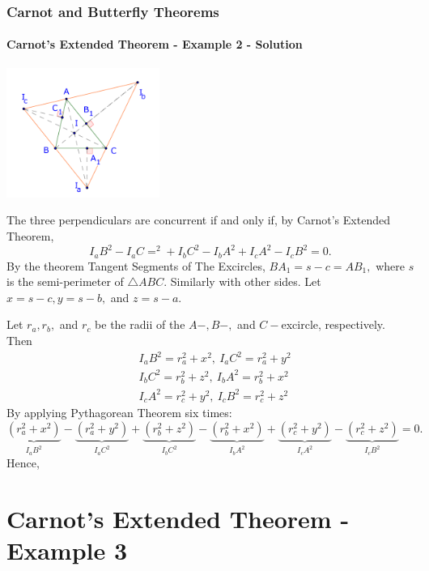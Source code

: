 \documentclass[8pt,xcolor=table,dvipsnames]{beamer}
\begin{document}
\begin{frame}[t]
    \frametitle{Carnot and Butterfly Theorems}
    \framesubtitle{Carnot's Extended Theorem - Example 2 - Solution}
    \begin{center}
        \includegraphics[width=5cm]{./svg/pdf/24-25-s7-g3-p2.pdf}
    \end{center}
    \begin{overprint}
        The three perpendiculars are concurrent if and only if, by Carnot's Extended Theorem,
        \[ {I_aB}^2 - {I_aC}=^2 + {I_bC}^2 - {I_bA}^2 + {I_cA}^2 - {I_cB}^2 = 0. \]
        By the theorem Tangent Segments of The Excircles, $BA_1 = s - c = AB_1,$
        where $s$ is the semi-perimeter of $\triangle ABC.$ Similarly with other sides.
        Let $x = s-c, y =s-b,$ and $z = s-a.$

        Let $r_a, r_b,$ and $r_c$ be the radii of the $A-, B-,$ and $C-$excircle, respectively.
        Then \[
            \begin{aligned}
                &{I_aB}^2 = r_a^2 + x^2,\ {I_aC}^2 = r_a^2 + y^2\\
                &{I_bC}^2 = r_b^2 + z^2,\ {I_bA}^2 = r_b^2 + x^2\\
                &{I_cA}^2 = r_c^2 + y^2,\ {I_cB}^2 = r_c^2 + z^2
            \end{aligned}
        \]
        By applying Pythagorean Theorem six times:
        \[
            \underbrace{(r_a^2 + x^2)}_{{I_aB}^2} - \underbrace{(r_a^2 + y^2)}_{{I_aC}^2} + \underbrace{(r_b^2 + z^2)}_{{I_bC}^2} 
            - \underbrace{(r_b^2 + x^2)}_{{I_bA}^2} + \underbrace{(r_c^2 + y^2)}_{{I_cA}^2} - \underbrace{(r_c^2 + z^2)}_{{I_cB}^2} = 0.
        \]
        Hence, 
    \end{overprint}
\end{frame}

\section{Carnot's Extended Theorem - Example 3}
\end{document}
